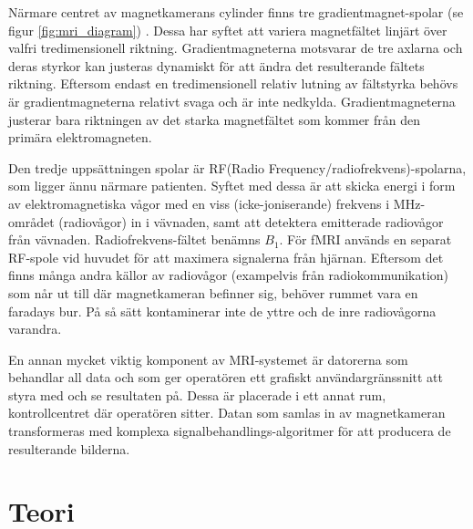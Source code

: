 \documentclass[11pt, a4paper]{article}
\begin{document}
Närmare centret av magnetkamerans cylinder finns tre gradient\-magnet-spolar (se figur \ref{fig:mri_diagram}) \parencite{understanding_mri}. Dessa har syftet att variera magnetfältet linjärt över valfri tredimensionell riktning. Gradientmagneterna motsvarar de tre axlarna och deras styrkor kan justeras dynamiskt för att ändra det resulterande fältets riktning. Eftersom endast en tredimensionell relativ lutning av fältstyrka behövs är gradientmagneterna relativt svaga och är inte nedkylda. Gradientmagneterna justerar bara riktningen av det starka magnetfältet som kommer från den primära elektromagneten.

Den tredje uppsättningen spolar är RF(Radio Frequency/radiofrekvens)-spolarna, som ligger ännu närmare patienten. Syftet med dessa är att skicka energi i form av elektromagnetiska vågor med en viss (icke-joniserande) frekvens i MHz-området (radiovågor) in i vävnaden, samt att detektera emitterade radiovågor från vävnaden. Radiofrekvens-fältet benämns $B_1$. För fMRI används en separat RF-spole vid huvudet för att maximera signalerna från hjärnan. Eftersom det finns många andra källor av radiovågor (exampelvis från radio\-kommunikation) som når ut till där magnetkameran befinner sig, behöver rummet vara en faradays bur. På så sätt kontaminerar inte de yttre och de inre radiovågorna varandra.

En annan mycket viktig komponent av MRI-systemet är datorerna som behandlar all data och som ger operatören ett grafiskt användargränssnitt att styra med och se resultaten på. Dessa är placerade i ett annat rum, kontrollcentret där operatören sitter. Datan som samlas in av magnetkameran transformeras med komplexa signalbehandlings-algoritmer för att producera de resulterande bilderna.

\section{Teori}

\end{document}
